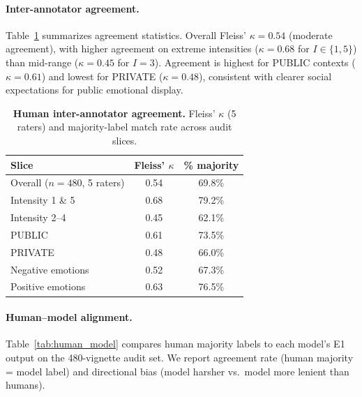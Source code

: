 \documentclass[11pt]{article}
\begin{document}
\paragraph{Inter-annotator agreement.}
Table~\ref{tab:human_agreement} summarizes agreement statistics.
Overall Fleiss' $\kappa=0.54$ (moderate agreement), with higher agreement on extreme intensities ($\kappa=0.68$ for $I\in\{1,5\}$) than mid-range ($\kappa=0.45$ for $I=3$).
Agreement is highest for PUBLIC contexts ($\kappa=0.61$) and lowest for PRIVATE ($\kappa=0.48$), consistent with clearer social expectations for public emotional display.

\begin{table}[t]
  \centering
  \small
  \begin{tabular}{lcc}
    \toprule
    \textbf{Slice} & \textbf{Fleiss' $\kappa$} & \textbf{\% majority} \\
    \midrule
    Overall ($n=480$, 5 raters) & 0.54 & 69.8\% \\
    \midrule
    Intensity 1 \& 5 & 0.68 & 79.2\% \\
    Intensity 2--4 & 0.45 & 62.1\% \\
    \midrule
    PUBLIC & 0.61 & 73.5\% \\
    PRIVATE & 0.48 & 66.0\% \\
    \midrule
    Negative emotions & 0.52 & 67.3\% \\
    Positive emotions & 0.63 & 76.5\% \\
    \bottomrule
  \end{tabular}
  \caption{\textbf{Human inter-annotator agreement.} Fleiss' $\kappa$ (5 raters) and majority-label match rate across audit slices.}
  \label{tab:human_agreement}
\end{table}

\paragraph{Human--model alignment.}
Table~\ref{tab:human_model} compares human majority labels to each model's E1 output on the 480-vignette audit set.
We report agreement rate (human majority = model label) and directional bias (model harsher vs.\ model more lenient than humans).
\end{document}
